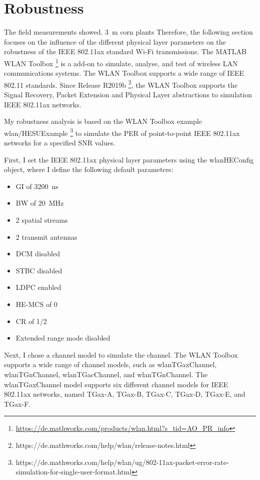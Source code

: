 \section{Robustness}
The field measurements showed.
\cite{smolnik_5g_2020} \SI{3}{\metre} corn plants
Therefore, the following section focuses on the influence of the different physical layer parameters on the robustness of the IEEE 802.11ax standard
Wi-Fi transmissions.
The MATLAB WLAN Toolbox \footnote{\url{https://de.mathworks.com/products/wlan.html?s_tid=AO_PR_info}} is a add-on to simulate, analyse, and test of wireless LAN communications systems.
The WLAN Toolbox supports a wide range of IEEE 802.11 standards.
Since Release R2019b \footnote{https://de.mathworks.com/help/wlan/release-notes.html}, the WLAN Toolbox supports the Signal Recovery, Packet Extension and Physical Layer abstractions to simulation IEEE 802.11ax networks.

My robustness analysis is based on the WLAN Toolbox example wlan/HESUExample \footnote{https://de.mathworks.com/help/wlan/ug/802-11ax-packet-error-rate-simulation-for-single-user-format.html} to simulate the \ac{PER} of point-to-point IEEE 802.11ax networks for
a specified \ac{SNR} values. 

First, I set the IEEE 802.11ax physical layer parameters using the wlanHEConfig object, where I define the following default parameters:
\begin{itemize}
	\item \ac{GI} of \SI{3200}{\nano\second}
	\item \ac{BW} of \SI{20}{\mega\hertz}
	\item 2 spatial streams
	\item 2 transmit antennas
	\item \ac{DCM} disabled
	\item \ac{STBC} disabled
	\item \ac{LDPC} enabled
	\item HE-\ac{MCS} of 0
	\item \ac{CR} of 1/2
	\item Extended range mode disabled
\end{itemize}
Next, I chose a channel model to simulate the channel. The WLAN Toolbox supports a wide range of channel models, such as wlanTGaxChannel, wlanTGnChannel, wlanTGacChannel, and wlanTGnChannel.
The wlanTGaxChannel model supports six different channel models for IEEE 802.11ax networks, named TGax-A, TGax-B, TGax-C, TGax-D, TGax-E, and TGax-F.


